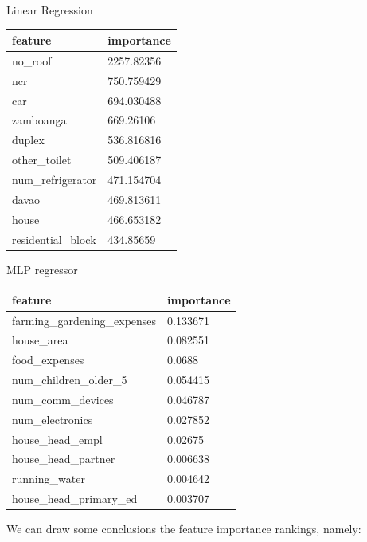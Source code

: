 \documentclass{article}
\begin{document}
\begin{multicols}{2}
\begin{flushleft}
\end{flushleft}
Linear Regression
\begin{flushleft}
\begin{tabular}{ |l|l| }
  \hline
  feature & importance\\
  \hline
  no\_roof & 2257.82356\\
  ncr & 750.759429\\
  car & 694.030488\\
  zamboanga & 669.26106\\
  duplex & 536.816816\\
  other\_toilet & 509.406187\\
  num\_refrigerator & 471.154704\\
  davao & 469.813611\\
  house & 466.653182\\
  residential\_block & 434.85659\\
  \hline
\end{tabular}
\end{flushleft}
MLP regressor
\begin{flushleft}
\begin{tabular}{ |l|l| }
  \hline
  feature & importance\\
  \hline
  farming\_gardening\_expenses & 0.133671\\
  house\_area & 0.082551\\
  food\_expenses & 0.0688\\
  num\_children\_older\_5 & 0.054415\\
  num\_comm\_devices & 0.046787\\
  num\_electronics & 0.027852\\
  house\_head\_empl & 0.02675\\
  house\_head\_partner & 0.006638\\
  running\_water & 0.004642\\
  house\_head\_primary\_ed & 0.003707\\
  \hline
\end{tabular}
\end{flushleft}
\end{multicols}

We can draw some conclusions the feature importance rankings, namely:
\end{document}
